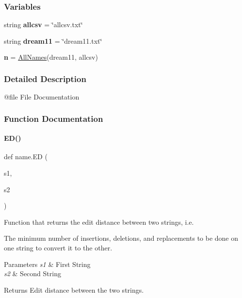 \subsubsection*{Variables}
\begin{DoxyCompactItemize}
\item 
\mbox{\label{namespacename_a6a28b676bb9c9e9706d9aa25f4765617}} 
string {\bfseries allcsv} = \char`\"{}allcsv.\+txt\char`\"{}
\item 
\mbox{\label{namespacename_a7de18046eebfeb49a93d166a1032b812}} 
string {\bfseries dream11} = \char`\"{}dream11.\+txt\char`\"{}
\item 
\mbox{\label{namespacename_a9aee4a418049160854f32659ce451668}} 
{\bfseries n} = \hyperlink{classname_1_1AllNames}{All\+Names}(dream11, allcsv)
\end{DoxyCompactItemize}


\subsubsection{Detailed Description}
\begin{DoxyVerb}@file File Documentation
\end{DoxyVerb}
 

\subsubsection{Function Documentation}
\mbox{\label{namespacename_aaf6a02e97478e39abbec27e09d4d3fc7}} 
\paragraph{\texorpdfstring{E\+D()}{ED()}}
{\footnotesize\ttfamily def name.\+ED (\begin{DoxyParamCaption}\item[{}]{s1,  }\item[{}]{s2 }\end{DoxyParamCaption})}



Function that returns the edit distance between two strings, i.\+e. 

The minimum number of insertions, deletions, and replacements to be done on one string to convert it to the other. 
\begin{DoxyParams}{Parameters}
{\em s1} & First String \\
\hline
{\em s2} & Second String \\
\hline
\end{DoxyParams}
\begin{DoxyReturn}{Returns}
Edit distance between the two strings. 
\end{DoxyReturn}
\mbox{\label{namespacename_aac6586237940f09049413cfc51952677}} 
